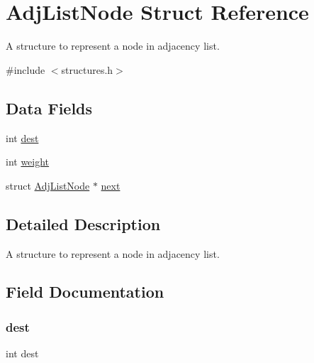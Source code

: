 \hypertarget{struct_adj_list_node}{}\section{Adj\+List\+Node Struct Reference}
\label{struct_adj_list_node}


A structure to represent a node in adjacency list.  




{\ttfamily \#include $<$structures.\+h$>$}

\subsection*{Data Fields}
\begin{DoxyCompactItemize}
\item 
int \mbox{\hyperlink{struct_adj_list_node_ae5163ff230abd4115d86194ad89467b5}{dest}}
\item 
int \mbox{\hyperlink{struct_adj_list_node_aa01147b1f07072d246c76dc85d69df7c}{weight}}
\item 
struct \mbox{\hyperlink{struct_adj_list_node}{Adj\+List\+Node}} $\ast$ \mbox{\hyperlink{struct_adj_list_node_a1a123a277dbd6f9b0102c4019449bd05}{next}}
\end{DoxyCompactItemize}


\subsection{Detailed Description}
A structure to represent a node in adjacency list. 

\subsection{Field Documentation}
\mbox{\label{struct_adj_list_node_ae5163ff230abd4115d86194ad89467b5}} 
\subsubsection{\texorpdfstring{dest}{dest}}
{\footnotesize\ttfamily int dest}

\mbox{\label{struct_adj_list_node_a1a123a277dbd6f9b0102c4019449bd05}} 
